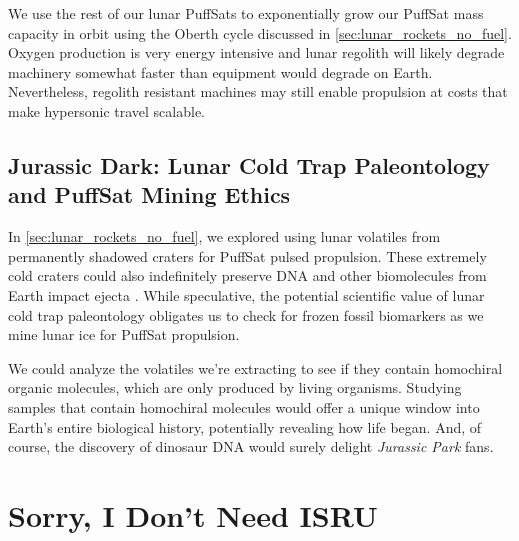 \documentclass{article}
\begin{document}
{We use the rest of our lunar PuffSats to exponentially grow our PuffSat mass capacity in orbit using the Oberth cycle discussed in \autoref{sec:lunar_rockets_no_fuel}.  Oxygen production is very energy intensive and lunar regolith will likely degrade machinery somewhat faster than equipment would degrade on Earth.  Nevertheless, regolith resistant machines  may still enable propulsion at costs that make hypersonic travel scalable.

\subsection{Jurassic Dark: Lunar Cold Trap Paleontology and PuffSat Mining Ethics}\label{sec:jurassic_dark}
In \autoref{sec:lunar_rockets_no_fuel}, we explored using lunar volatiles from permanently shadowed craters for PuffSat pulsed propulsion. These extremely cold craters could also indefinitely preserve DNA and other biomolecules from Earth impact ejecta \cite{dino_dna}. While speculative, the potential scientific value of lunar cold trap paleontology obligates us to check for frozen fossil biomarkers as we mine lunar ice for PuffSat propulsion.

We could analyze the volatiles we're extracting to see if they contain homochiral organic molecules, which are only produced by living organisms.   Studying samples that contain homochiral molecules would offer a unique window into Earth's entire biological history, potentially revealing how life began. And, of course, the discovery of dinosaur DNA would surely delight \textit{Jurassic Park} \cite{jurassic_park} fans.

\section{Sorry, I Don't Need ISRU}
}
\end{document}
